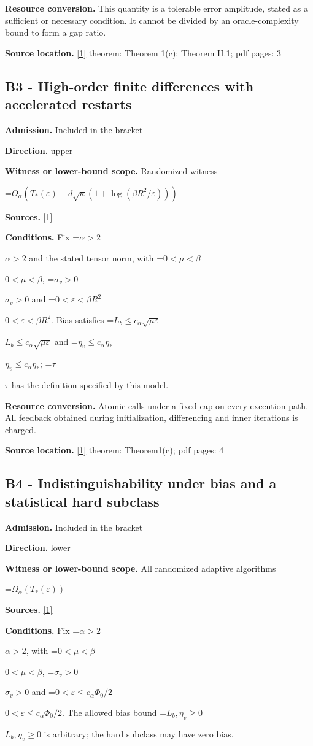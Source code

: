 \documentclass[10pt,a4paper]{article}
\newcommand{\AtlasMath}[1]{\par\begingroup\centering\setbox0=\hbox{$\displaystyle #1$}\ifdim\wd0>1.4\linewidth\typeout{ATLAS WIDE FORMULA: \the\wd0}\fi\ifdim\wd0>\linewidth\resizebox{\linewidth}{!}{\box0}\else\box0\fi\par\endgroup}
\newcommand{\AtlasInlineMath}[1]{\begingroup\setbox0=\hbox{$#1$}\ifdim\wd0>.4\linewidth\endgroup\AtlasMath{#1}\else\endgroup$#1$\fi}
\begin{document}
\textbf{Resource conversion.} This quantity is a tolerable error amplitude, stated as a sufficient or necessary condition. It cannot be divided by an oracle-complexity bound to form a gap ratio.

\textbf{Source location.} \href{https://arxiv.org/pdf/2610.05517v2}{[1]} theorem: Theorem 1(c); Theorem H.1; pdf pages: 3

\subsection{B3 - High-order finite differences with accelerated restarts}
\textbf{Admission.} Included in the bracket

\textbf{Direction.} upper

\textbf{Witness or lower-bound scope.} Randomized witness

\AtlasMath{O_\alpha(T_*(\varepsilon)+d\sqrt\kappa(1+\log(\beta R^2/\varepsilon)))}
\textbf{Sources.} \href{https://arxiv.org/pdf/2610.05517v2}{[1]}

\textbf{Conditions.} Fix \AtlasInlineMath{\alpha>2} and the stated tensor norm, with \AtlasInlineMath{0<\mu<\beta}, \AtlasInlineMath{\sigma_v>0} and \AtlasInlineMath{0<\varepsilon<\beta R^2}. Bias satisfies \AtlasInlineMath{L_b\le c_\alpha\sqrt{\mu\varepsilon}} and \AtlasInlineMath{\eta_v\le c_\alpha\eta_*}; \AtlasInlineMath{\tau} has the definition specified by this model.

\textbf{Resource conversion.} Atomic calls under a fixed cap on every execution path. All feedback obtained during initialization, differencing and inner iterations is charged.

\textbf{Source location.} \href{https://arxiv.org/pdf/2610.05517v2}{[1]} theorem: Theorem1(c); pdf pages: 4

\subsection{B4 - Indistinguishability under bias and a statistical hard subclass}
\textbf{Admission.} Included in the bracket

\textbf{Direction.} lower

\textbf{Witness or lower-bound scope.} All randomized adaptive algorithms

\AtlasMath{\Omega_\alpha(T_*(\varepsilon))}
\textbf{Sources.} \href{https://arxiv.org/pdf/2610.05517v2}{[1]}

\textbf{Conditions.} Fix \AtlasInlineMath{\alpha>2}, with \AtlasInlineMath{0<\mu<\beta}, \AtlasInlineMath{\sigma_v>0} and \AtlasInlineMath{0<\varepsilon\le c_\alpha\Phi_0/2}. The allowed bias bound \AtlasInlineMath{L_b,\eta_v\ge0} is arbitrary; the hard subclass may have zero bias.
\end{document}

